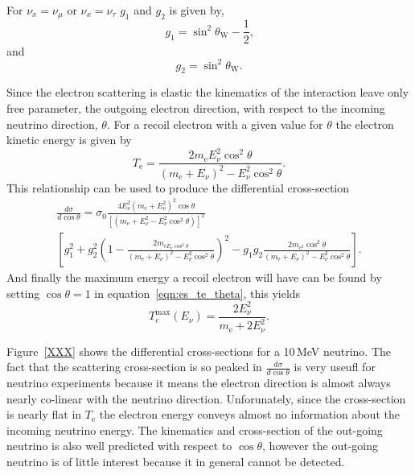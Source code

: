 For $\nu_{x} = \nu_{\mu}$ or $\nu_{x} = \nu_{\tau}$ $g_{1}$ and $g_{2}$ is
given by,
\begin{equation}
    g_{1} = \sin^{2}\theta_{\mathrm{W}} - \frac{1}{2}\text{,}
\end{equation}
and
\begin{equation}
    g_{2} = \sin^{2}\theta_{\mathrm{W}}\text{.}
\end{equation}

Since the electron scattering is elastic the kinematics of the interaction
leave only free parameter, the outgoing electron direction, with respect
to the incoming neutrino direction, $\theta$.
For a recoil electron with a given value for $\theta$ the electron kinetic energy is
given by
\begin{equation}
    T_{\mathrm{e}}=\frac{2m_{\mathrm{e}}E_{\nu}^{2}\cos^{2}\theta}{(m_{\mathrm{e}}+E_{\nu})^2 - E_{\nu}^{2}\cos^2\theta}\text{.}
    \label{eqn:es_te_theta}
\end{equation}
This relationship can be used to produce the differential cross-section
\begin{multline}
    \frac{d\sigma}{d\cos\theta}=\sigma_{0}\frac{4E_{\nu}^{2}(m_{\mathrm{e}}+E_{\nu}^{2})^2\cos\theta}{\left[(m_{\mathrm{e}}+E_{\nu}^{2} -E_{\nu}^{2}\cos^2\theta)\right]^2}\\
    \left[g_{1}^{2} + g_{2}^{2}\left(1 - \frac{2m_{\mathrm{e}E_{\nu}\cos^{2}\theta}}{(m_{\mathrm{e}}+E_{\nu})^2 -E_{\nu}^{2}\cos^2\theta} \right)^{2} - g_{1}g_{2}\frac{2m_{\mathrm{e}^{2}}\cos^{2}\theta}{(m_{\mathrm{e}}+E_{\nu})^{2}-E_{\nu}^{2}\cos^{2}\theta}\right]
    \text{.}
\end{multline}
And finally the maximum energy a recoil electron will have can be found by
setting $\cos\theta=1$ in equation~\eqref{eqn:es_te_theta}, this yields
\begin{equation}
    T_{e}^{\max}(E_\nu) = \frac{2E_{\nu}^{2}}{m_{\mathrm{e}}+ 2E_{\nu}^{2} }\text{.}
\end{equation}

Figure~\ref{XXX} shows the differential cross-sections for a 10\,MeV neutrino.
The fact that the scattering cross-section is so peaked in $\frac{d\sigma}{d\cos\theta}$
is very useufl for neutrino experiments because it means the electron direction
is almost always nearly co-linear with the neutrino direction.
Unforunately, since the cross-section is nearly flat in $T_{\mathrm{e}}$
the electron energy conveys almost no information about the incoming neutrino
energy.
The kinematics and cross-section of the out-going neutrino is also
well predicted with respect to $\cos\theta$, however the out-going
neutrino is of little interest because it in general cannot be detected.

